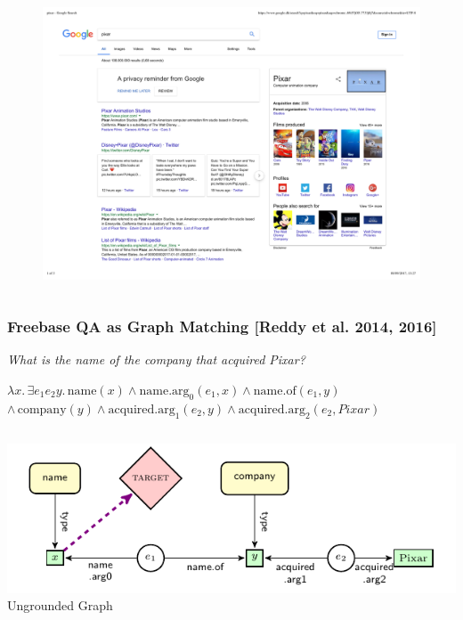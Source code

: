 \documentclass[mathserif,12pt]{beamer}
\begin{document}
\begin{frame}
\begin{columns}
 \begin{column}{0.45\textwidth}
 \vspace{-1cm}
 \begin{figure}
  \includegraphics[scale=0.65]{figures/pixar_kb} 
 \end{figure}
 \end{column}
\end{columns}
\end{frame}

\begin{frame}
\frametitle{Freebase QA as Graph Matching {\small [Reddy et al. 2014, 2016]}}
\large
\begin{center}
  \textsl{What is the name of the company that acquired Pixar?} 
  
  \vspace{2em}
  
  $\lambda x. \, \exists e_1 e_2 y. \, \mathrm{name}(x) \wedge \mathrm{name.arg_0}(e_1, x) \wedge \mathrm{name.of}(e_1, y)$ \\ $\wedge\, \mathrm{company}(y) \wedge \mathrm{acquired.arg_1}(e_2, y) \wedge \mathrm{acquired.arg_2}(e_2, Pixar)$
\end{center}

\vspace{2em}
\pause
\begin{columns}
  \begin{column}{0.58\textwidth}
   \centering
\includegraphics[width=\textwidth]{figures/transitive_ungrounded_mismatch}\\ Ungrounded Graph
  \end{column}
\end{columns}
\end{frame}
\end{document}
